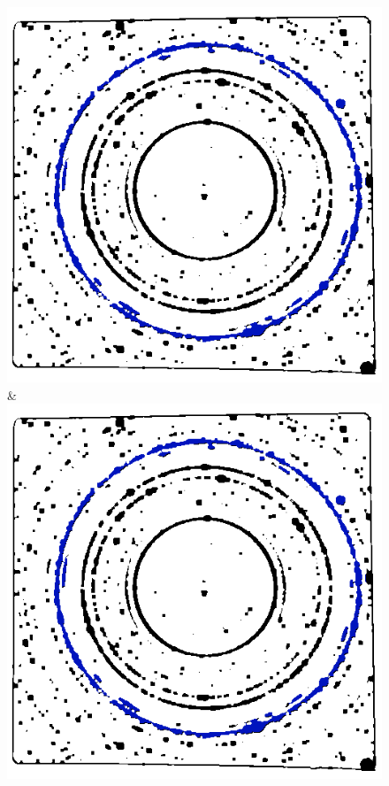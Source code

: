 \documentclass[preprint]{iucr}              %
\begin{document}
\begin{figure}
\begin{tabular}
\includegraphics[width=\linewidth]{Detail/o_Si12_0002_R_2_6.png}&
\includegraphics[width=\linewidth]{Detail/o_Si12_0002_RF_2_7.png}
\\

\end{tabular}
\end{figure}
\end{document}
